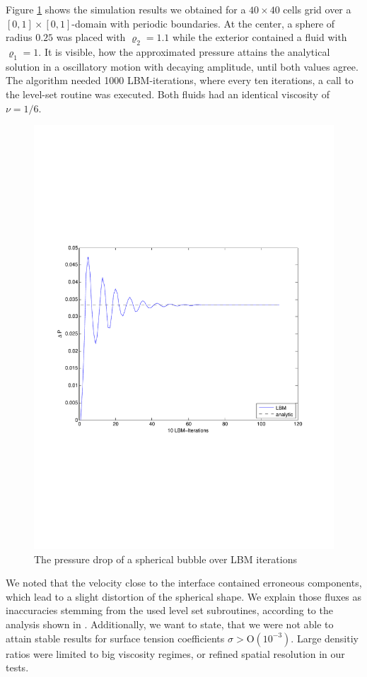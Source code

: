 \documentclass[final,leqno,onefignum,onetabnum]{siamltexmm}
\begin{document}
Figure \ref{laplace} shows the simulation results we obtained for a $40 \times 40$ cells grid over a $[0,1]\times[0,1]$-domain with periodic boundaries. At the center, a sphere of radius $0.25$ was placed with $\varrho_2 = 1.1$ while the exterior contained a fluid with $\varrho_1 = 1$. It is visible, how the approximated pressure attains the analytical solution in a oscillatory motion with decaying amplitude, until both values agree. The algorithm needed 1000 LBM-iterations, where every ten iterations, a call to the level-set routine was executed. Both fluids had an identical viscosity of $\nu = 1/6$.
\begin{figure}[t!]
	\flushright
	\hfill\includegraphics[trim = 0mm 7.75cm 0mm 8.06cm, clip, width=.8\textwidth, natwidth=595,natheight=842]{laplace.pdf}\hspace*{\fill}
	\caption{The pressure drop of a spherical bubble over LBM iterations}
	\label{laplace}
\end{figure}
We noted that the velocity close to the interface contained erroneous components, which lead to a slight distortion of the spherical shape. We explain those fluxes as inaccuracies stemming from the used level set subroutines, according to the analysis shown in \cite{Thoemmes2}.
Additionally, we want to state, that we were not able to attain stable results for surface tension coefficients $\sigma > \mathrm{O(10^{-3})}$. Large densitiy ratios were limited to big viscosity regimes, or refined spatial resolution in our tests.
\end{document}
